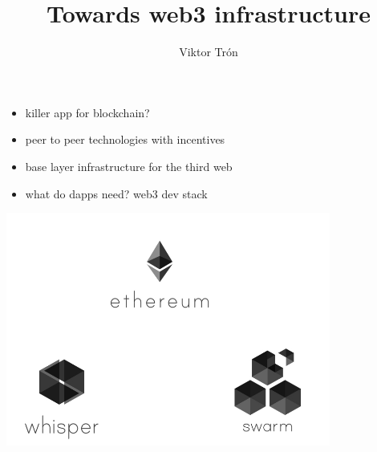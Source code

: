 \documentclass{beamer}
\title{Towards web3 infrastructure}
\author{Viktor Trón}
\begin{document}
\begin{frame}
 \titlepage
\end{frame}

\begin{frame}
\begin{block}{}
\begin{itemize}
\item killer app for blockchain?
\item peer to peer technologies with incentives
\item base layer infrastructure for the third web
\item what do dapps need? web3 dev stack
\end{itemize}
\end{block}
\end{frame}



\begin{frame}[plain,c]
\begin{center}
\includegraphics[width=0.8\textwidth]{ecosystem0.jpg}
\end{center}
\end{frame}
\end{document}
